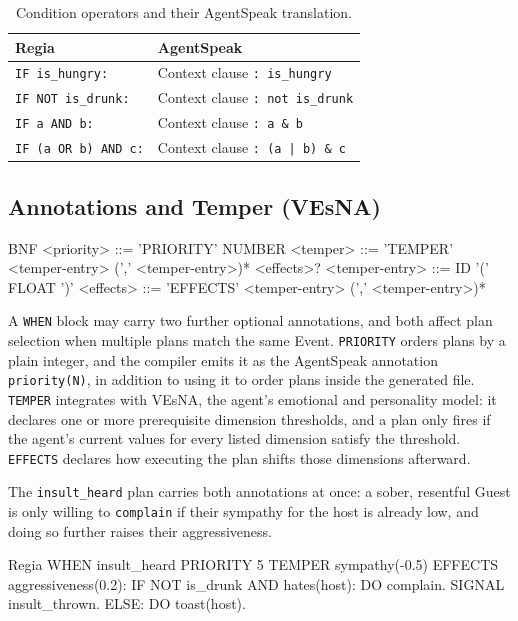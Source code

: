 \begin{table}[h]
\centering
\begin{tabular}{|l|l|}
\hline
\textbf{Regia} & \textbf{AgentSpeak} \\
\hline
\lstinline|IF is_hungry:| & Context clause \lstinline|: is_hungry| \\
\lstinline|IF NOT is_drunk:| & Context clause \lstinline|: not is_drunk| \\
\lstinline|IF a AND b:| & Context clause \lstinline|: a & b| \\
\lstinline|IF (a OR b) AND c:| & Context clause \lstinline+: (a | b) & c+ \\
\hline
\end{tabular}
\caption{Condition operators and their AgentSpeak translation.}
\label{tab:condition-mapping}
\end{table}

\subsection{Annotations and Temper (VEsNA)}
\label{sec:priority-temper}

\begin{codeblock}[]{BNF}
    <priority>      ::= 'PRIORITY' NUMBER
    <temper>        ::= 'TEMPER' <temper-entry> (',' <temper-entry>)* <effects>?
    <temper-entry>  ::= ID '(' FLOAT ')'
    <effects>       ::= 'EFFECTS' <temper-entry> (',' <temper-entry>)*
\end{codeblock}

A \lstinline|WHEN| block may carry two further optional annotations, and both affect plan selection when multiple plans match the same Event. \lstinline|PRIORITY| orders plans by a plain integer, and the compiler emits it as the AgentSpeak annotation \lstinline|priority(N)|, in addition to using it to order plans inside the generated file. \lstinline|TEMPER| integrates with VEsNA, the agent's emotional and personality model: it declares one or more prerequisite dimension thresholds, and a plan only fires if the agent's current values for every listed dimension satisfy the threshold. \lstinline|EFFECTS| declares how executing the plan shifts those dimensions afterward.

The \lstinline|insult_heard| plan carries both annotations at once: a sober, resentful Guest is only willing to \lstinline|complain| if their sympathy for the host is already low, and doing so further raises their aggressiveness.

\begin{codeblock}[]{Regia}
WHEN insult_heard PRIORITY 5 TEMPER sympathy(-0.5) EFFECTS aggressiveness(0.2):
    IF NOT is_drunk AND hates(host):
        DO complain.
        SIGNAL insult_thrown.
    ELSE:
        DO toast(host).
\end{codeblock}

